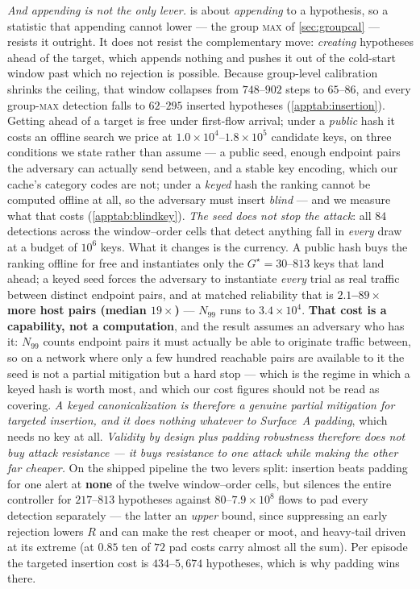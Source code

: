 \documentclass[conference]{IEEEtran}
\begin{document}
\emph{And appending is not the only lever.}  is about \emph{appending} to a
hypothesis, so a statistic that appending cannot lower --- the group \textsc{max} of
\cref{sec:groupcal} --- resists it outright. It does not resist the complementary move: \emph{creating}
hypotheses ahead of the target, which appends nothing and pushes it out of the cold-start window past
which no rejection is possible. Because group-level calibration shrinks the ceiling, that window
collapses from $748$--$902$ steps to $65$--$86$, and every group-\textsc{max} detection falls to
$62$--$295$ inserted hypotheses (\cref{apptab:insertion}). Getting ahead of a target is free under
first-flow arrival; under a \emph{public} hash it costs an offline search we price at
$1.0\times10^{4}$--$1.8\times10^{5}$ candidate keys, on three conditions we state rather than assume --- a public
seed, enough endpoint pairs the adversary can actually send between, and a stable key encoding, which
our cache's category codes are not; under a \emph{keyed} hash the ranking cannot be computed offline
at all, so the adversary must insert \emph{blind} --- and we measure what that costs
(\cref{apptab:blindkey}). \emph{The seed does not stop the attack}: all $84$ detections across the
window--order cells that detect anything fall in \emph{every} draw at a budget of $10^{6}$ keys. What
it changes is the currency. A public hash buys the ranking offline for free and instantiates only the
$G^{\star} = 30$--$813$ keys that land ahead; a keyed seed forces the adversary to instantiate
\emph{every} trial as real traffic between distinct endpoint pairs, and at matched reliability that is
\textbf{$2.1$--$89\times$ more host pairs (median $19\times$)} --- $N_{99}$ runs to $3.4\times10^{4}$.
\textbf{That cost is a capability, not a computation}, and the result assumes an adversary who has it:
$N_{99}$ counts endpoint pairs it must actually be able to originate traffic between, so on a network
where only a few hundred reachable pairs are available to it the seed is not a partial mitigation but
a hard stop --- which is the regime in which a keyed hash is worth most, and which our cost figures
should not be read as covering.
\emph{A keyed canonicalization is therefore a genuine partial mitigation for targeted insertion, and it
does nothing whatever to Surface~A padding}, which needs no key at all. \emph{Validity by design plus padding
robustness therefore does not buy attack resistance --- it buys resistance to one attack while making
the other far cheaper.} On the shipped pipeline the two levers split: insertion beats
padding for one alert at \textbf{none} of the twelve window--order cells, but silences the entire
controller for $217$--$813$
hypotheses against $80$--$7.9\times10^{8}$ flows to pad every detection separately --- the latter an
\emph{upper} bound, since suppressing an early rejection lowers $R$ and can make the rest cheaper or
moot, and heavy-tail driven at its extreme (at $0.85$ ten of $72$ pad costs carry almost all the sum).
Per episode the targeted insertion cost is $434$--$5{,}674$ hypotheses, which is why padding wins
there.
\end{document}
